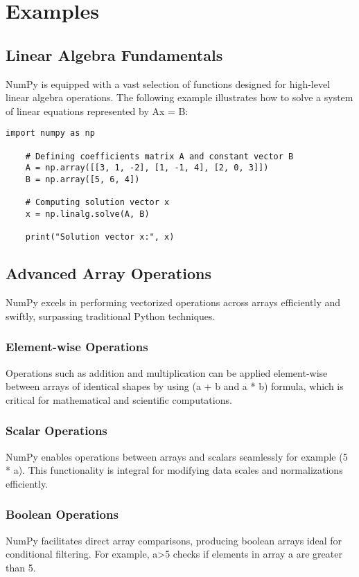 \section{Examples}

\subsection{Linear Algebra Fundamentals}
NumPy is equipped with a vast selection of functions designed for high-level linear algebra operations. The following example illustrates how to solve a system of linear equations represented by Ax = B:

\begin{lstlisting}[caption={Example code to solve a system of linear equations using NumPy}, label={code:numpy-linalg-solve}, style=pythonstyle]
	import numpy as np
	
	# Defining coefficients matrix A and constant vector B
	A = np.array([[3, 1, -2], [1, -1, 4], [2, 0, 3]])
	B = np.array([5, 6, 4])
	
	# Computing solution vector x
	x = np.linalg.solve(A, B)
	
	print("Solution vector x:", x)
\end{lstlisting}


\subsection{Advanced Array Operations}
NumPy excels in performing vectorized operations across arrays efficiently and swiftly, surpassing traditional Python techniques.

\subsubsection{Element-wise Operations}
Operations such as addition and multiplication can be applied element-wise between arrays of identical shapes by using (a + b and a * b) formula, which is critical for mathematical and scientific computations.

\subsubsection{Scalar Operations}
NumPy enables operations between arrays and scalars seamlessly for example (5 * a). This functionality is integral for modifying data scales and normalizations efficiently.


\subsubsection{Boolean Operations}
NumPy facilitates direct array comparisons, producing boolean arrays ideal for conditional filtering. For example, a>5 checks if elements in array a are greater than 5. 

